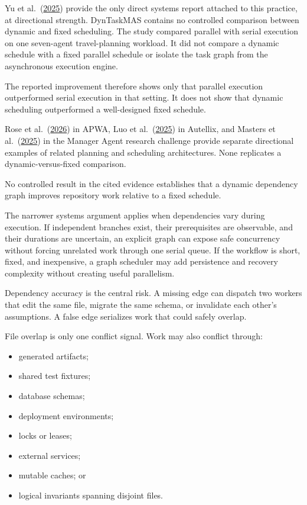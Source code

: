 Yu et al.~(\href{https://arxiv.org/abs/2503.07675}{2025}) provide the only direct systems report attached to this practice, at directional strength. DynTaskMAS contains no controlled comparison between dynamic and fixed scheduling. The study compared parallel with serial execution on one seven-agent travel-planning workload. It did not compare a dynamic schedule with a fixed parallel schedule or isolate the task graph from the asynchronous execution engine.

The reported improvement therefore shows only that parallel execution outperformed serial execution in that setting. It does not show that dynamic scheduling outperformed a well-designed fixed schedule.

Rose et al.~(\href{https://arxiv.org/abs/2605.15132}{2026}) in APWA, Luo et al.~(\href{https://arxiv.org/abs/2502.13965}{2025}) in Autellix, and Masters et al.~(\href{https://arxiv.org/abs/2510.02557}{2025}) in the Manager Agent research challenge provide separate directional examples of related planning and scheduling architectures. None replicates a dynamic-versus-fixed comparison.

No controlled result in the cited evidence establishes that a dynamic dependency graph improves repository work relative to a fixed schedule.

The narrower systems argument applies when dependencies vary during execution. If independent branches exist, their prerequisites are observable, and their durations are uncertain, an explicit graph can expose safe concurrency without forcing unrelated work through one serial queue. If the workflow is short, fixed, and inexpensive, a graph scheduler may add persistence and recovery complexity without creating useful parallelism.

Dependency accuracy is the central risk. A missing edge can dispatch two workers that edit the same file, migrate the same schema, or invalidate each other's assumptions. A false edge serializes work that could safely overlap.

File overlap is only one conflict signal. Work may also conflict through:

\begin{itemize}
\tightlist
\item
  generated artifacts;
\item
  shared test fixtures;
\item
  database schemas;
\item
  deployment environments;
\item
  locks or leases;
\item
  external services;
\item
  mutable caches; or
\item
  logical invariants spanning disjoint files.
\end{itemize}

